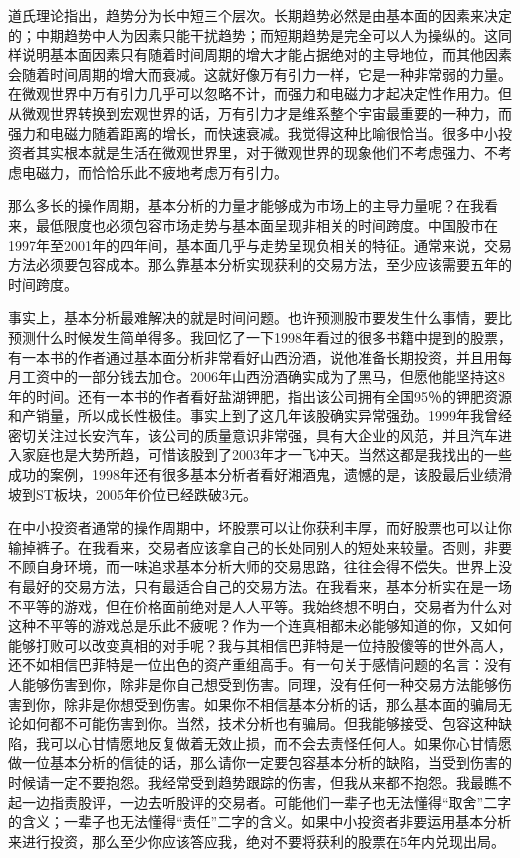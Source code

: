 道氏理论指出，趋势分为长中短三个层次。长期趋势必然是由基本面的因素来决定的；中期趋势中人为因素只能干扰趋势；而短期趋势是完全可以人为操纵的。这同样说明基本面因素只有随着时间周期的增大才能占据绝对的主导地位，而其他因素会随着时间周期的增大而衰减。这就好像万有引力一样，它是一种非常弱的力量。在微观世界中万有引力几乎可以忽略不计，而强力和电磁力才起决定性作用力。但从微观世界转换到宏观世界的话，万有引力才是维系整个宇宙最重要的一种力，而强力和电磁力随着距离的增长，而快速衰减。我觉得这种比喻很恰当。很多中小投资者其实根本就是生活在微观世界里，对于微观世界的现象他们不考虑强力、不考虑电磁力，而恰恰乐此不疲地考虑万有引力。

那么多长的操作周期，基本分析的力量才能够成为市场上的主导力量呢？在我看来，最低限度也必须包容市场走势与基本面呈现非相关的时间跨度。中国股市在1997年至2001年的四年间，基本面几乎与走势呈现负相关的特征。通常来说，交易方法必须要包容成本。那么靠基本分析实现获利的交易方法，至少应该需要五年的时间跨度。

事实上，基本分析最难解决的就是时间问题。也许预测股市要发生什么事情，要比预测什么时候发生简单得多。我回忆了一下1998年看过的很多书籍中提到的股票，有一本书的作者通过基本面分析非常看好山西汾酒，说他准备长期投资，并且用每月工资中的一部分钱去加仓。2006年山西汾酒确实成为了黑马，但愿他能坚持这8年的时间。还有一本书的作者看好盐湖钾肥，指出该公司拥有全国95％的钾肥资源和产销量，所以成长性极佳。事实上到了这几年该股确实异常强劲。1999年我曾经密切关注过长安汽车，该公司的质量意识非常强，具有大企业的风范，并且汽车进入家庭也是大势所趋，可惜该股到了2003年才一飞冲天。当然这都是我找出的一些成功的案例，1998年还有很多基本分析者看好湘酒鬼，遗憾的是，该股最后业绩滑坡到ST板块，2005年价位已经跌破3元。

在中小投资者通常的操作周期中，坏股票可以让你获利丰厚，而好股票也可以让你输掉裤子。在我看来，交易者应该拿自己的长处同别人的短处来较量。否则，非要不顾自身环境，而一味追求基本分析大师的交易思路，往往会得不偿失。世界上没有最好的交易方法，只有最适合自己的交易方法。在我看来，基本分析实在是一场不平等的游戏，但在价格面前绝对是人人平等。我始终想不明白，交易者为什么对这种不平等的游戏总是乐此不疲呢？作为一个连真相都未必能够知道的你，又如何能够打败可以改变真相的对手呢？我与其相信巴菲特是一位持股傻等的世外高人，还不如相信巴菲特是一位出色的资产重组高手。有一句关于感情问题的名言：没有人能够伤害到你，除非是你自己想受到伤害。同理，没有任何一种交易方法能够伤害到你，除非是你想受到伤害。如果你不相信基本分析的话，那么基本面的骗局无论如何都不可能伤害到你。当然，技术分析也有骗局。但我能够接受、包容这种缺陷，我可以心甘情愿地反复做着无效止损，而不会去责怪任何人。如果你心甘情愿做一位基本分析的信徒的话，那么请你一定要包容基本分析的缺陷，当受到伤害的时候请一定不要抱怨。我经常受到趋势跟踪的伤害，但我从来都不抱怨。我最瞧不起一边指责股评，一边去听股评的交易者。可能他们一辈子也无法懂得“取舍”二字的含义；一辈子也无法懂得“责任”二字的含义。如果中小投资者非要运用基本分析来进行投资，那么至少你应该答应我，绝对不要将获利的股票在5年内兑现出局。

